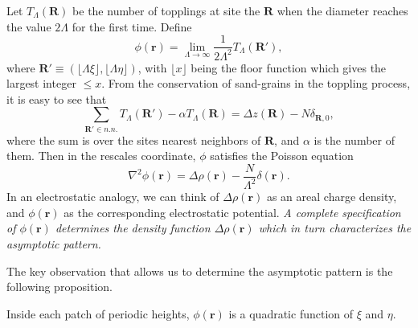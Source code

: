 \documentclass[11pt,a4paper]{book}
\begin{document}
Let $T_{\Lambda}\left( \mathbf{R} \right)$ be the number of topplings at site
the $\mathbf{R}$ when the diameter reaches the value $2\Lambda$ for the first time.
Define
\begin{equation}
\phi\left( \mathbf{r} \right)=\lim_{\Lambda\rightarrow\infty}\frac{1}{2\Lambda^{2}}T_{\Lambda}\left( \mathbf{R}' \right),
\label{phi}
\end{equation}
where $\mathbf{R}'\equiv\left(\lfloor\Lambda \xi \rfloor, \lfloor\Lambda \eta \rfloor\right)$,
with $\lfloor x \rfloor$ being the floor function which gives the largest
integer $\le x$. 
From the conservation of sand-grains in the toppling process, it is easy to see that
\begin{equation}
\sum_{\mathbf{R'}\in n.n.}T_{\Lambda}\left( \mathbf{R'}
\right)-\alpha T_{\Lambda}\left( \mathbf{R} \right)= \Delta z\left(
\mathbf{R} \right)-N \delta_{\mathbf{R},0},
\end{equation}
where the sum is over the sites nearest neighbors of
$\mathbf{R}$, and $\alpha$ is the number of them. Then in the rescales coordinate,
$\phi$ satisfies the Poisson equation
\begin{equation}
\nabla^{2}\phi\left( \mathbf{r} \right)=\Delta\rho\left( \mathbf{r} \right)-\frac{N}{\Lambda^{2}}\delta\left( \mathbf{r} \right).
\label{poisson0}
\end{equation}
In an electrostatic analogy, we can think of $\Delta\rho(\mathbf{r})$
as an areal 
charge density, and $\phi(\mathbf{r})$ as the corresponding 
electrostatic potential. \textit{A complete specification of $\phi\left( \mathbf{r} \right)$ determines
the density function $\Delta\rho\left( \mathbf{r} \right)$ which in turn
characterizes the asymptotic pattern.}

The key observation that allows us to determine the asymptotic pattern 
is the following proposition.
\begin{proposition}
Inside each patch of periodic heights, 
$\phi(\mathbf{r})$ is a quadratic function of $\xi$ and $\eta$.
\label{lemma1}
\end{proposition}
\end{document}
